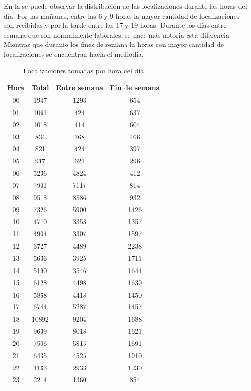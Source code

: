 En la  se puede observar la distribución de las localizaciones durante las horas del día. Por las mañanas, entre las 6 y 9 horas la mayor cantidad de localizaciones son recibidas y por la tarde entre las 17 y 19 horas. Durante los días entre semana que son normalmente laborales, se hace más notoria esta diferencia. Mientras que durante los fines de semana la horas con mayor cantidad de localizaciones se encuentran hacia el mediodía.

\begin{table}[!h]
	\centering
	\begin{tabular}{cccc}
        \toprule
    	Hora  & Total & Entre semana & Fin de semana\\
    	\midrule
    	00 & 1947 & 1293 & 654 \\
    	01 & 1061 & 424 & 637 \\
    	02 & 1018 & 414 & 604 \\ 
    	03 & 834 & 368 & 466\\
    	04 & 821 & 424 & 397\\
    	05 & 917 & 621 & 296\\
    	06 & 5236 & 4824 & 412 \\
    	07 & 7931 & 7117 & 814\\
    	08 & 9518 & 8586 & 932\\
    	09 & 7326 & 5900 & 1426\\ 
    	10 & 4710 & 3353 & 1357\\
    	11 & 4904 & 3307 & 1597\\
    	12 & 6727 & 4489 & 2238\\
    	13 & 5636 & 3925 & 1711\\
    	14 & 5190 & 3546 & 1644\\
    	15 & 6128 & 4498 & 1630\\
    	16 & 5868 & 4418 & 1450\\ 
    	17 & 6744 & 5287 & 1457\\
    	18 & 10892 & 9204 & 1688\\
    	19 & 9639 & 8018 & 1621\\
    	20 & 7506 & 5815 & 1691\\
    	21 & 6435 & 4525 & 1910\\
    	22 & 4163 & 2933 & 1230 \\
    	23 & 2214 & 1360 & 854\\
    	\bottomrule
	\end{tabular}
	\caption{Localizaciones tomadas por hora del día} 
	\label{table:localizaciones_por_hora}
\end{table}

